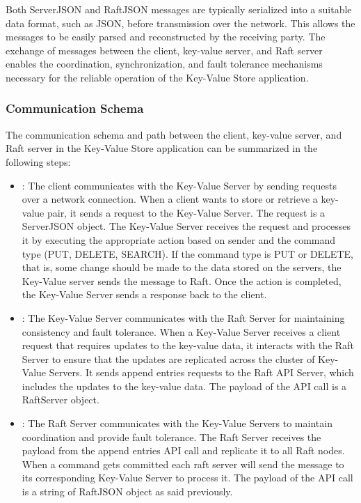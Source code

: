 \documentclass{article}
\begin{document}
Both ServerJSON and RaftJSON messages are typically serialized into a suitable data format,
such as JSON, before transmission over the network. This allows the messages to be easily
parsed and reconstructed by the receiving party. The exchange of messages between the client,
key-value server, and Raft server enables the coordination, synchronization, and fault tolerance
mechanisms necessary for the reliable operation of the Key-Value Store application.

\subsubsection{Communication Schema}
The communication schema and path between the client, key-value server, and Raft server in the
Key-Value Store application can be summarized in the following steps:
\begin{itemize}
    \item {}: The client communicates with the Key-Value Server
    by sending requests over a network connection. When a client wants to store or retrieve
    a key-value pair, it sends a request to the Key-Value Server. The request is a ServerJSON
    object. The Key-Value Server receives the request and processes it by executing the
    appropriate action based on sender and the command type (PUT, DELETE, SEARCH). If the
    command type is PUT or DELETE, that is, some change should be made to the data stored on
    the servers, the Key-Value server sends the message to Raft. Once the action is completed, 
    the Key-Value Server sends a response back to the client.
    \item {}: The Key-Value Server communicates with the
    Raft Server for maintaining consistency and fault tolerance. When a Key-Value Server
    receives a client request that requires updates to the key-value data, it interacts with
    the Raft Server to ensure that the updates are replicated across the cluster of Key-Value
    Servers. It sends append entries requests to the Raft API Server, which includes the updates
    to the key-value data. The payload of the API call is a RaftServer object.
    \item {}: The Raft Server communicates with the Key-Value
    Servers to maintain coordination and provide fault tolerance. The Raft Server receives the
    payload from the append entries API call and replicate it to all Raft nodes. When a command
    gets committed each raft server will send the message to its corresponding Key-Value Server 
    to process it. The payload of the API call is a string of RaftJSON object as said previously.
\end{itemize}
\end{document}
